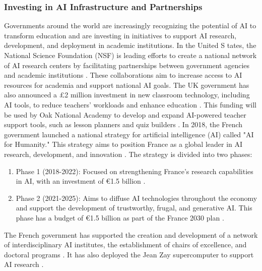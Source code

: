 \documentclass{article}
\begin{document}
\subsubsection{Investing in AI Infrastructure and Partnerships}
Governments around the world are increasingly recognizing
the potential of AI to transform education and are investing
in initiatives to support AI research, development,
and deployment in academic institutions. In the United S
tates, the National Science Foundation (NSF) is leading
efforts to create a national network of AI research centers
by facilitating partnerships between government agencies
and academic institutions
\cite{datainnovation_ai_universities}. These collaborations
aim to increase access to AI resources for academia
and support national AI goals.
The UK government has also announced a £2 million
investment in new classroom technology, including
AI tools, to reduce teachers' workloads and enhance
education \cite{dig_watch_ai_investment} \cite{openaccessgov_ai_teacher_support}.
This funding will be used by Oak National Academy to
develop and expand AI-powered teacher support tools,
such as lesson planners and quiz builders
\cite{govuk_ai_teacher_support} \cite{openaccessgov_ai_teacher_support}.
In 2018, the French government launched a national
strategy for artificial intelligence (AI) called
"AI for Humanity." This strategy aims to position France
as a global leader in AI research, development,
and innovation \cite{economie_gouv_ai_strategy}
\cite{entreprises_gouv_ai_strategy}. The strategy is divided into two phases:
\begin{enumerate}
    \item Phase 1 (2018-2022): Focused on strengthening France's research capabilities in AI, with an investment of €1.5 billion \cite{economie_gouv_ai_strategy} \cite{entreprises_gouv_ai_strategy} \cite{enseignementsup_recherche_ai_strategy}.
    \item Phase 2 (2021-2025): Aims to diffuse AI technologies throughout the economy and support the development of trustworthy, frugal, and generative AI. This phase has a budget of €1.5 billion as part of the France 2030 plan \cite{economie_gouv_ai_strategy} \cite{entreprises_gouv_ai_strategy}.
\end{enumerate}
The French government has supported the creation and development of a network of interdisciplinary AI institutes, the establishment of chairs of excellence, and doctoral programs \cite{entreprises_gouv_ai_strategy} \cite{enseignementsup_recherche_ai_strategy}. It has also deployed the Jean Zay supercomputer to support AI research \cite{entreprises_gouv_ai_strategy}.
\end{document}
